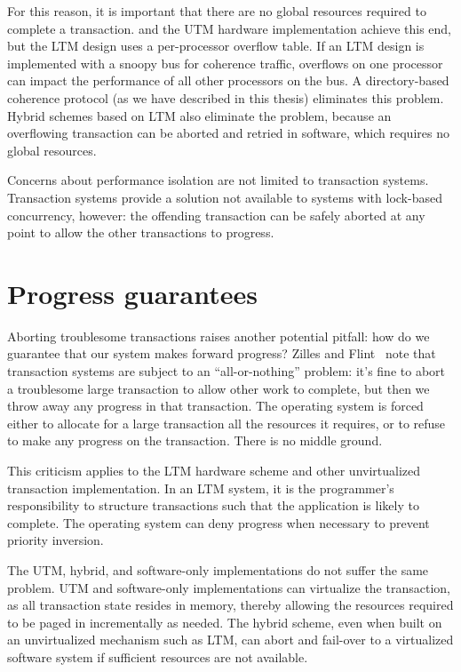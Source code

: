 For this reason, it is important that there are no global resources
required to complete a transaction.  \apex and the UTM hardware implementation
achieve this end, but the LTM design uses a per-processor overflow
table.  If an LTM design is implemented with a snoopy bus for
coherence traffic, overflows on one processor can impact the
performance of all other processors on the bus.  A directory-based
coherence protocol (as we have described in this thesis) eliminates
this problem.  Hybrid schemes based on LTM also eliminate the problem,
because an overflowing transaction can be aborted and retried in
software, which requires no global resources.

Concerns about performance isolation are not limited to transaction
systems.  Transaction systems provide a solution not available to
systems with lock-based concurrency, however: the offending
transaction can be safely aborted at any point to allow the other
transactions to progress.

\section{Progress guarantees}\label{sec:progress}
Aborting troublesome transactions raises another potential pitfall:
how do we guarantee that our system makes forward progress?
Zilles and Flint~\cite{ZillesFl05} note that transaction systems are
subject to an ``all-or-nothing'' problem: it's fine to abort a
troublesome large transaction to allow other work to complete, but
then we throw away any progress in that transaction.  The operating
system is forced either to allocate for a large transaction all the
resources it requires, or to refuse to make any progress on the
transaction.  There is no middle ground.

This criticism applies to the LTM hardware scheme and other
unvirtualized transaction implementation.  In an LTM system, it is the
programmer's responsibility to structure transactions such that the
application is likely to complete.  The operating system can deny
progress when necessary to prevent priority inversion.

The UTM, hybrid, and software-only implementations do not suffer the
same problem.  UTM and software-only implementations can virtualize
the transaction, as all transaction state resides in memory, thereby allowing
the resources required to be paged in incrementally as
needed.  The hybrid scheme, even when built on an unvirtualized
mechanism such as LTM, can abort and fail-over to a virtualized
software system if sufficient resources are not available.

